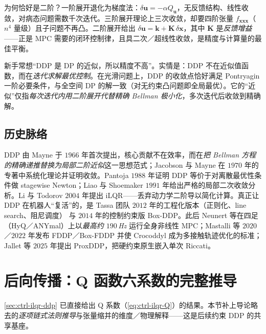 为何恰好是二阶？一阶展开退化为梯度法：$\delta\mathbf{u}=-\alpha Q_{\mathbf{u}}$，无反馈结构、线性收敛，对病态问题需数千次迭代。三阶展开理论上三次收敛，却要四阶张量 $f_{\mathbf{xxx}}$（$n^4$ 量级）且子问题不再凸。二阶展开给出 $\delta\mathbf{u}=\mathbf{k}+\mathbf{K}\,\delta\mathbf{x}$，其中 $\mathbf{K}$ 是\emph{反馈增益}——正是 MPC 需要的闭环控制律，且具二次／超线性收敛，是精度与计算量的最佳平衡。

\begin{pitfall}
新手常想“DDP 是 DP 的近似，所以精度不高”。实情是：DDP 不在近似值函数，而在\emph{迭代求解最优控制}。在光滑问题上，DDP 的收敛点恰好满足 Pontryagin 一阶必要条件，与全空间 DP 的解一致（对无约束凸问题即全局最优）。它的“近似”仅指\emph{每次迭代内用二阶展开代替精确 Bellman 极小化}，多次迭代后收敛到精确解。
\end{pitfall}

\subsection{历史脉络}
\label{sec:ddp-history}

DDP 由 Mayne 于 $1966$ 年首次提出\cite{mayne1966ddp}，核心贡献不在效率，而在\emph{把 Bellman 方程的精确递推替换为局部二阶近似}这一思想范式；Jacobson 与 Mayne 在 $1970$ 年的专著中系统化理论并证明收敛\cite{jacobson1970ddp}。Pantoja $1988$ 年证明 DDP 等价于对离散最优性条件做 stagewise Newton\cite{pantoja1988ddp}；Liao 与 Shoemaker $1991$ 年给出严格的局部二次收敛分析\cite{liao1991convergence}。Li 与 Todorov $2004$ 年提出 iLQR——丢弃动力学二阶导以简化计算\cite{li2004ilqr}。真正让 DDP 在机器人“复活”的，是 Tassa 团队 $2012$ 年的工程化版本（正则化、line search、阻尼调度）\cite{tassa2012ilqg} 与 $2014$ 年的控制约束版 Box-DDP\cite{tassa2014ddp}。此后 Neunert 等在四足（HyQ／ANYmal）上以\emph{最高约 $190$\,Hz} 运行全身非线性 MPC\cite{neunert2018wholebody}；Mastalli 等 $2020$／$2022$ 年发布 FDDP／Box-FDDP 并使 Crocoddyl 成为多接触轨迹优化的标准\cite{mastalli2020crocoddyl,mastalli2022boxfddp}；Jallet 等 $2025$ 年提出 ProxDDP，把硬约束原生嵌入单次 Riccati\cite{jallet2025proxddp}。

\section{后向传播：Q 函数六系数的完整推导}
\label{sec:ddp-backward}

\cref{sec:ctrl-ilqr-ddp} 已直接给出 Q 系数（\cref{eq:ctrl-ilqr-Q}）的结果。本节补上导论略去的\emph{逐项链式法则推导}与张量缩并的维度／物理解释——这是后续约束 DDP 的共享基座。

